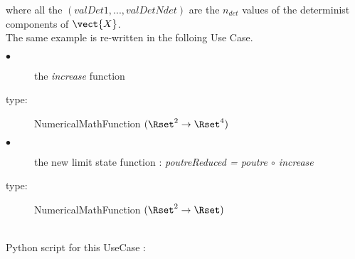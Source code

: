 where all the $(valDet1, ..., valDetNdet)$ are the $n_{det}$ values of the determinist components of $\vect{X}$.\\

The same example is re-written in the folloing Use Case.

{
  \begin{description}
  \item[$\bullet$] the {\itshape increase} function
  \item[type:] NumericalMathFunction $(\Rset^2 \rightarrow \Rset^4)$
  \item[$\bullet$]  the new limit state function : {\itshape poutreReduced = poutre $\circ$ increase}
  \item[type:] NumericalMathFunction $(\Rset^2 \rightarrow \Rset)$
  \end{description}
}

\textspace\\
Python script for this UseCase :

